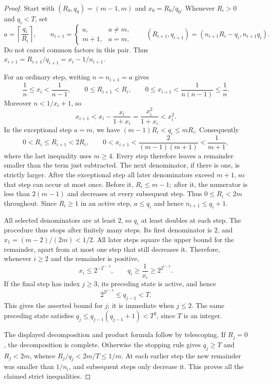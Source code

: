 \begin{proof}
Start with $(R_0,q_0)=(m-1,m)$ and $x_0=R_0/q_0$.
Whenever $R_i>0$ and $q_i<T$, set
\[
 a=\left\lceil\frac{q_i}{R_i}\right\rceil,
 \qquad
 n_{i+1}=\begin{cases}a,&a\ne m,\\m+1,&a=m,\end{cases}
 \qquad
 (R_{i+1},q_{i+1})=(n_{i+1}R_i-q_i,n_{i+1}q_i).
\]
Do not cancel common factors in this pair.  Thus
$x_{i+1}=R_{i+1}/q_{i+1}=x_i-1/n_{i+1}$.

For an ordinary step, writing $n=n_{i+1}=a$ gives
\[
  \frac1n\le x_i<\frac1{n-1},\qquad
  0\le R_{i+1}<R_i,\qquad
  0\le x_{i+1}<\frac1{n(n-1)}\le\frac1n.
\]
Moreover $n<1/x_i+1$, so
\[
 x_{i+1}<x_i-\frac{x_i}{1+x_i}
          =\frac{x_i^2}{1+x_i}<x_i^2.
\]
In the exceptional step $a=m$, we have
$(m-1)R_i<q_i\le mR_i$.  Consequently
\[
  0<R_i\le R_{i+1}<2R_i,
  \qquad
  0<x_{i+1}
   <\frac2{(m-1)(m+1)}<\frac1{m+1},
\]
where the last inequality uses $m\ge4$.
Every step therefore leaves a remainder smaller than the term just
subtracted.  The next denominator, if there is one, is strictly larger.
After the exceptional step all later denominators exceed $m+1$, so that
step can occur at most once.  Before it, $R_i\le m-1$; after it, the
numerator is less than $2(m-1)$ and decreases at every subsequent step.
Thus $0\le R_i<2m$ throughout.
Since $R_i\ge1$ in an active step, $a\le q_i$ and hence
$n_{i+1}\le q_i+1$.

All selected denominators are at least $2$, so $q_i$ at least doubles
at each step.  The procedure thus stops after finitely many steps.
Its first denominator is $2$, and
$x_1=(m-2)/(2m)<1/2$.
All later steps square the upper bound for the remainder, apart from
at most one step that still decreases it.  Therefore, whenever $i\ge2$
and the remainder is positive,
\[
 x_i\le 2^{-2^{i-2}},\qquad q_i\ge\frac1{x_i}
                 \ge2^{2^{i-2}}.
\]
If the final step has index $j\ge3$, its preceding state is active,
and hence
\[
 2^{2^{j-3}}\le q_{j-1}<T.
\]
This gives the asserted bound for $j$; it is immediate when $j\le2$.
The same preceding state satisfies
$q_j\le q_{j-1}(q_{j-1}+1)<T^2$, since $T$ is an integer.

The displayed decomposition and product formula follow by telescoping.
If $R_j=0$, the decomposition is complete.  Otherwise the stopping rule
gives $q_j\ge T$ and $R_j<2m$, whence
$R_j/q_j<2m/T\le1/m$.
At each earlier step the new remainder was smaller than $1/n_i$,
and subsequent steps only decrease it.  This proves all the claimed
strict inequalities.
\end{proof}

